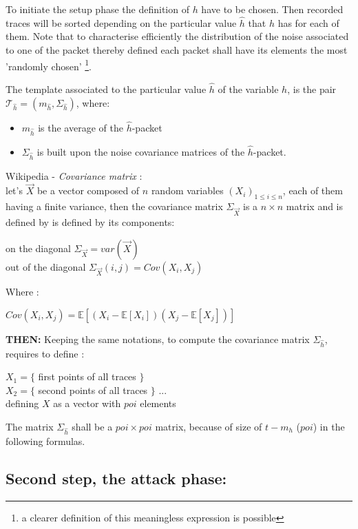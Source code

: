 To initiate the setup phase the definition of $h$ have to be chosen.
Then recorded traces will be sorted depending on the particular value $\hat{h}$  that  $h$ has for each of them.
Note that to characterise efficiently the distribution of the noise associated to one of the packet thereby defined each packet shall have its elements the most 'randomly chosen'
\footnote{a clearer definition of this meaningless expression is possible}.

\newpage
The template associated to the particular value $\hat{h}$ of the variable $h$, 
is the pair $ \mathcal{T}_{\hat{h}} = ( m_{\hat{h}} ,\Sigma_{\hat{h}} )$, where:
	\begin{itemize}
		\item $ m_{\hat{h}} $ is the average of the $\hat{h}$-packet 
		\item $ \Sigma_{\hat{h}} $ is built upon the noise covariance matrices of the $\hat{h}$-packet.
	\end{itemize}

Wikipedia - \textit{Covariance matrix} :\\
let's $\vec{X}$ be a vector composed of $n$ random variables 
$(X_i)_{1 \leq i \leq n}$,
each of them having a finite variance, then the covariance matrix 
$\Sigma_{ \vec{X} }$ is a 
$ n \times n $ matrix and is defined by
is defined by its components:
\begin{center}
	on the diagonal $\Sigma_{ \vec{X} }  = var(\vec{X})$ \\
	\vspace{1mm}
	out of the diagonal $\Sigma_{ \vec{X} }(i,j) = Cov(X_i, X_j)$
	\end{center} 
Where : 
\begin{center}
$Cov(X_i,X_j) = \mathbb{E}[(X_i-\mathbb{E}[X_i])(X_j-\mathbb{E}[X_j])]$
\end{center} 

\textbf{THEN:}
Keeping the same notations, to compute the covariance matrix 
$ \Sigma_{\hat{h}} $, requires to define :
\begin{center}
$X_1 = \{$  first points  of all traces $\}$ \\ 
$X_2 = \{$  second points of all traces $\}$ ...\\
defining $X$ as a vector with $poi$ elements 
\end{center}
The  matrix $ \Sigma_{\hat{h}} $ shall be a $poi \times poi$ 
matrix, because of size of $t-m_h$ ($poi$) in the following formulas.


\subsection*{Second step, the attack phase:}

